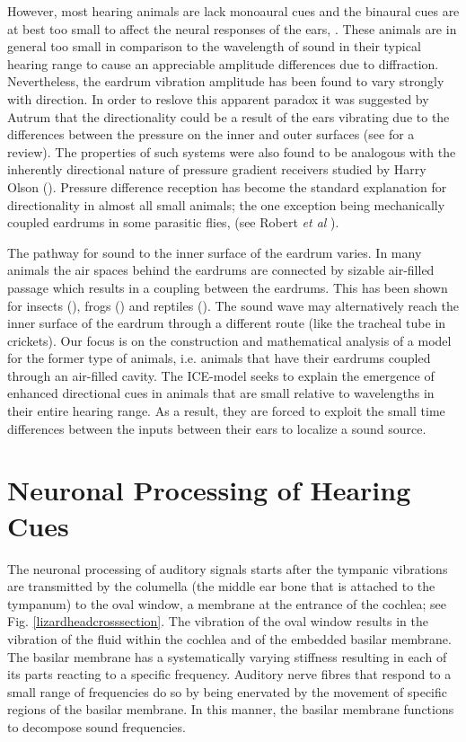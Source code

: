 However, most hearing animals are lack monoaural cues and the binaural
cues are at best too small to affect the neural responses of the ears, \cite{michelsen1}. These animals are in general too small in comparison
to the wavelength of sound in their typical hearing range to cause an appreciable amplitude differences due to diffraction. Nevertheless, 
the eardrum vibration amplitude has been found to vary strongly with direction. In order to reslove this apparent paradox it was
suggested by Autrum \cite{autrumjcomphys} that the directionality could be a result of the ears vibrating due to the
differences between the pressure on the inner and outer surfaces (see \cite{michelsenlarsen} for a review).  The properties of such systems were also found to be analogous with the inherently directional 
nature of pressure gradient receivers studied by Harry Olson (\cite{olsonmichrophones}). Pressure difference reception has
become the standard explanation for directionality in almost all small animals; the one exception being mechanically coupled
eardrums in some parasitic flies, (see Robert \emph{et al} \cite{roberthoy}).

The pathway for sound to the inner surface of the eardrum varies. In many animals the air spaces behind the eardrums are
connected by sizable air-filled passage which results in a coupling between the eardrums. This has been shown for 
insects (\cite{michelsenbiophysics}), frogs (\cite{jorgensenanurans}) and reptiles (\cite{dalsgaardmanley1}). The sound wave
may alternatively reach the inner surface of the eardrum through a different route (like the tracheal tube in crickets). Our focus
is on the construction and mathematical analysis of a model for the former type of animals, i.e. animals that have their eardrums coupled through an air-filled cavity. 
The ICE-model seeks to explain the emergence of enhanced directional cues in animals that are small relative to wavelengths
in their entire hearing range. As a result, they are forced to exploit the small time differences between the inputs between
their ears to localize a sound source.


\section{Neuronal Processing of Hearing Cues}\label{iceneuro}
The neuronal processing of auditory signals starts after the tympanic vibrations are transmitted by the columella (the middle ear bone that is attached to the tympanum)
to the oval window, a membrane at the entrance of the cochlea; see Fig. \ref{lizardheadcrosssection}. The vibration of the oval window results in the vibration of
the fluid within the cochlea and of the embedded basilar membrane. The basilar membrane has a systematically varying stiffness resulting in each of its parts 
reacting to a specific frequency. Auditory nerve fibres that respond to a small range of frequencies do so by being enervated by the movement of specific
regions of the basilar membrane. In this manner, the basilar membrane functions to decompose sound frequencies.

